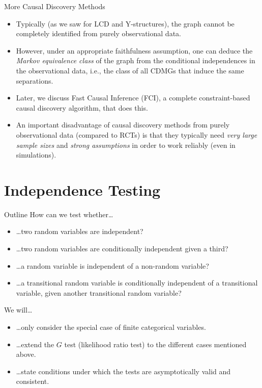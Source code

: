\begin{frame}{More Causal Discovery Methods}
  \begin{itemize}
    \item Typically (as we saw for LCD and Y-structures), the graph cannot be completely identified from purely observational data.
    \item However, under an appropriate faithfulness assumption, one can deduce the \emph{Markov
  equivalence class} of the graph from the conditional independences in the observational data, 
  i.e., the class of all CDMGs that induce the same separations.
    \item Later, we discuss Fast Causal Inference (FCI), a complete constraint-based causal discovery algorithm,
      that does this.
    \item An important disadvantage of causal discovery methods from purely observational data (compared to RCTs) is that
      they typically need \emph{very large sample sizes} and \emph{strong assumptions} in order to work reliably (even in simulations).
  \end{itemize}
\end{frame}


\part{Independence Testing}
\frame{\partpage}

\begin{frame}{Outline}
How can we test whether\dots
\begin{itemize}
  \item \dots two random variables are independent?
  \item \dots two random variables are conditionally independent given a third?
  \item \dots a random variable is independent of a non-random variable?
  \item \dots a transitional random variable is conditionally independent of a transitional variable, given another transitional random variable?
\end{itemize}

\bigskip
We will\dots
  \begin{itemize}
    \item \dots only consider the special case of finite categorical variables.
    \item \dots extend the $G$ test (likelihood ratio test) to the different cases mentioned above.
    \item \dots state conditions under which the tests are asymptotically valid and consistent.
  \end{itemize}
\end{frame}

